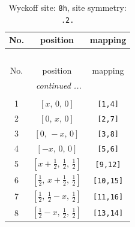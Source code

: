 \documentclass[fleqn,8pt]{jsarticle}
\begin{document}
\begin{longtable}{ccc}
\caption{Wyckoff site: {\tt 8h}, site symmetry: {\tt .2.}}
 \\
 \hline \hline
No. & position & mapping \\ \hline \endfirsthead

\multicolumn{2}{l}{\tablename\ \thetable{}} \\
 \hline \hline
No. & position & mapping \\ \hline \endhead

 \hline \hline
\multicolumn{2}{r}{\footnotesize\it continued ...} \\ \endfoot

 \hline \hline
\multicolumn{2}{r}{} \\ \endlastfoot

1 & $\left[ x,\, 0,\, 0 \right]$ & {\tt [1,4]} \\ \hline
2 & $\left[ 0,\, x,\, 0 \right]$ & {\tt [2,7]} \\ \hline
3 & $\left[ 0,\, - x,\, 0 \right]$ & {\tt [3,8]} \\ \hline
4 & $\left[ - x,\, 0,\, 0 \right]$ & {\tt [5,6]} \\ \hline
5 & $\left[ x + \frac{1}{2},\, \frac{1}{2},\, \frac{1}{2} \right]$ & {\tt [9,12]} \\ \hline
6 & $\left[ \frac{1}{2},\, x + \frac{1}{2},\, \frac{1}{2} \right]$ & {\tt [10,15]} \\ \hline
7 & $\left[ \frac{1}{2},\, \frac{1}{2} - x,\, \frac{1}{2} \right]$ & {\tt [11,16]} \\ \hline
8 & $\left[ \frac{1}{2} - x,\, \frac{1}{2},\, \frac{1}{2} \right]$ & {\tt [13,14]} \\
\end{longtable}
\renewcommand{\arraystretch}{1.2}
\end{document}
